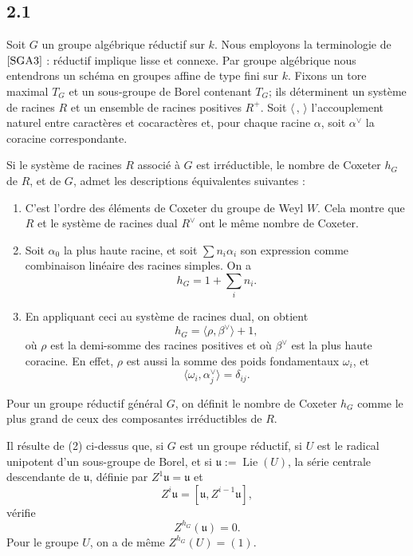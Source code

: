 \documentclass[11pt]{article}
\newcommand{\Lie}{\operatorname{Lie}}
\begin{document}
\subsection*{2.1}

Soit \(G\) un groupe algébrique réductif sur \(k\). Nous employons la terminologie de
\([{\rm SGA3}]\) : réductif implique lisse et connexe. Par groupe algébrique nous
entendrons un schéma en groupes affine de type fini sur \(k\). Fixons un tore maximal
\(T_G\) et un sous-groupe de Borel contenant \(T_G\); ils déterminent un système de
racines \(R\) et un ensemble de racines positives \(R^+\). Soit
\(\langle\, ,\,\rangle\) l'accouplement naturel entre caractères et cocaractères et, pour
chaque racine \(\alpha\), soit \(\alpha^\vee\) la coracine correspondante.

Si le système de racines \(R\) associé à \(G\) est irréductible, le nombre de Coxeter
\(h_G\) de \(R\), et de \(G\), admet les descriptions équivalentes suivantes :
\begin{enumerate}[label=(\arabic*),leftmargin=2em]
\item C'est l'ordre des éléments de Coxeter du groupe de Weyl \(W\). Cela montre que
\(R\) et le système de racines dual \(R^\vee\) ont le même nombre de Coxeter.
\item Soit \(\alpha_0\) la plus haute racine, et soit \(\sum n_i\alpha_i\) son expression
comme combinaison linéaire des racines simples. On a
\[
  h_G=1+\sum_i n_i. \tag{2.1.1}
\]
\item En appliquant ceci au système de racines dual, on obtient
\[
  h_G=\langle \rho,\beta^\vee\rangle+1,
\]
où \(\rho\) est la demi-somme des racines positives et où \(\beta^\vee\) est la plus
haute coracine. En effet, \(\rho\) est aussi la somme des poids fondamentaux
\(\omega_i\), et
\[
  \langle \omega_i,\alpha_j^\vee\rangle=\delta_{ij}.
\]
\end{enumerate}

Pour un groupe réductif général \(G\), on définit le nombre de Coxeter \(h_G\) comme
le plus grand de ceux des composantes irréductibles de \(R\).

Il résulte de (2) ci-dessus que, si \(G\) est un groupe réductif, si \(U\) est le radical
unipotent d'un sous-groupe de Borel, et si \(\mathfrak u:=\Lie(U)\), la série centrale
descendante de \(\mathfrak u\), définie par \(Z^1\mathfrak u=\mathfrak u\) et
\[
  Z^i\mathfrak u=[\mathfrak u,Z^{i-1}\mathfrak u],
\]
vérifie
\[
  Z^{h_G}(\mathfrak u)=0. \tag{2.1.2}
\]
Pour le groupe \(U\), on a de même \(Z^{h_G}(U)=(1)\).
\end{document}
